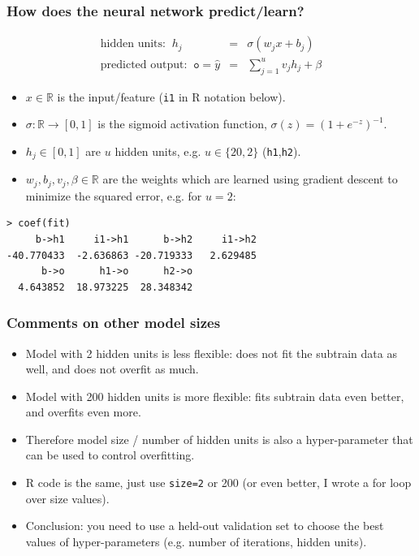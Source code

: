 \documentclass{beamer}
\begin{document}
\begin{frame}[fragile]
  \frametitle{How does the neural network predict/learn?}

  \begin{eqnarray*}
    \text{hidden units: }\ h_j &=& \sigma(w_j x + b_j) \\
    \text{predicted output: }\  \texttt{o} = \hat y &=& \sum_{j=1}^u v_j h_j + \beta
  \end{eqnarray*}

  \begin{itemize}
  \item $x\in\mathbb R$ is the input/feature (\texttt{i1} in R notation below).
  \item $\sigma:\mathbb R\rightarrow [0,1]$ is the sigmoid activation
    function, $\sigma(z)=(1+e^{-z})^{-1}$.
  \item $h_j\in[0,1]$ are $u$ hidden units, e.g. $u\in\{20, 2\}$ (\texttt{h1},\texttt{h2}).
  \item $w_j,b_j,v_j,\beta\in\mathbb R$ are the weights which are
    learned using gradient descent to minimize the squared error, e.g. for $u=2$:
  \end{itemize}

\begin{verbatim}
> coef(fit)
     b->h1     i1->h1      b->h2     i1->h2 
-40.770433  -2.636863 -20.719333   2.629485 
      b->o      h1->o      h2->o 
  4.643852  18.973225  28.348342 
\end{verbatim}
\end{frame}




\begin{frame}
  \frametitle{Comments on other model sizes}
  \begin{itemize}
  \item Model with 2 hidden units is less flexible: does not fit the subtrain
    data as well, and does not overfit as much.
  \item Model with 200 hidden units is more flexible: fits subtrain
    data even better, and overfits even more.
  \item Therefore model size / number of hidden units is also a
    hyper-parameter that can be used to control overfitting.
  \item R code is the same, just use \texttt{size=2} or 200 (or even
    better, I wrote a for loop over size values).
  \item Conclusion: you need to use a held-out validation set to
    choose the best values of hyper-parameters (e.g. number of
    iterations, hidden units).
  \end{itemize}
\end{frame}
\end{document}

